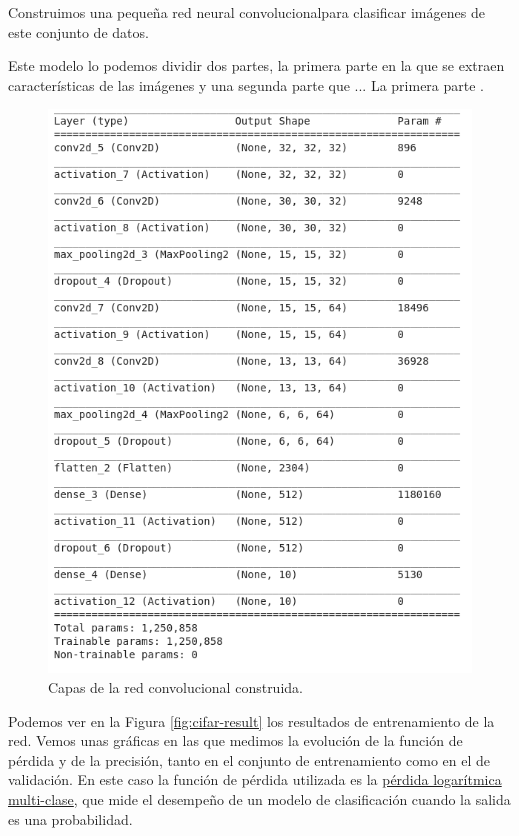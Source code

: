 \documentclass[
  a4paper,
  12pt,
  spanish,
]{scrartcl}
\theoremstyle{teorema-style}
\begin{document}
\begin{enumerate}
Construimos una pequeña red neural convolucional\footnotemark para clasificar imágenes de este conjunto de datos.

Este modelo lo podemos dividir dos partes, la primera parte en la que se extraen características de las imágenes y una segunda parte que ... La primera parte .


\begin{figure}[h]
  \centering
  \includegraphics[width=.7\textwidth]{img/model}
  \caption{Capas de la red convolucional construida.}
  \label{fig:model}
\end{figure}

Podemos ver en la Figura \ref{fig:cifar-result} los resultados de entrenamiento de la red. Vemos unas gráficas en las que medimos la evolución de la función de pérdida y de la precisión, tanto en el conjunto de entrenamiento como en el de validación. En este caso la función de pérdida utilizada es la \href{http://wiki.fast.ai/index.php/Log_Loss}{pérdida logarítmica multi-clase}, que mide el desempeño de un modelo de clasificación cuando la salida es una probabilidad.


\end{enumerate}
\end{document}
